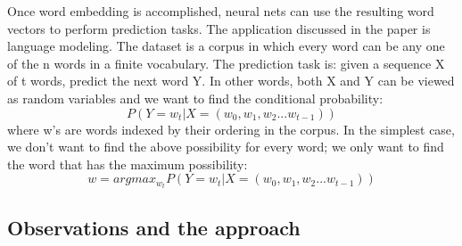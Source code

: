 \documentclass{article}
\begin{document}
Once word embedding is accomplished, neural nets can use the resulting word vectors to perform prediction tasks. The application discussed in the paper is language modeling. The dataset is a corpus in which every word can be any one of the n words in a finite vocabulary. The prediction task is: given a sequence X of t words, predict the next word Y. In other words, both X and Y can be viewed as random variables and we want to find the conditional probability:
\begin{equation}
P(Y = w_t|X = (w_0, w_1, w_2 ... w_{t-1}))
\end{equation}
where w's are words indexed by their ordering in the corpus. In the simplest case, we don't want to find the above possibility for every word; we only want to find the word that has the maximum possibility:
\begin{equation}
	w = argmax_{w_t}P(Y = w_t|X = (w_0, w_1, w_2 ... w_{t-1}))
\end{equation}

\subsection{Observations and the approach}
\end{document}
